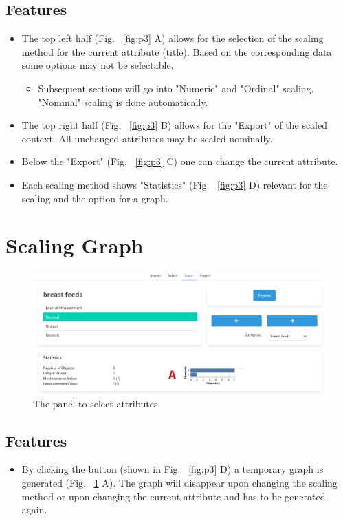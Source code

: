 \documentclass[]{article}
\begin{document}
\subsection{Features}
\begin{itemize}
    \item The top left half (Fig. ~\ref{fig:p3} A) allows for the selection of the scaling method for the current attribute (title). Based on the corresponding data some options may not be selectable.
    \begin{itemize}
        \item Subsequent sections will go into "Numeric" and "Ordinal" scaling. "Nominal" scaling is done automatically.
    \end{itemize}
    \item The top right half (Fig. ~\ref{fig:p3} B) allows for the "Export" of the scaled context. All unchanged attributes may be scaled nominally.
    \item Below the "Export" (Fig. ~\ref{fig:p3} C) one can change the current attribute.
    \item Each scaling method shows "Statistics" (Fig. ~\ref{fig:p3} D) relevant for the scaling and the option for a graph.
\end{itemize}

\section{Scaling Graph}
\begin{figure}[H]
	\includegraphics[width=\linewidth]{images/nominal_graph.png}
	\caption{The panel to select attributes}
	\label{fig:p4}
\end{figure}
\subsection{Features}
\begin{itemize}
    \item By clicking the button (shown in Fig. ~\ref{fig:p3} D)  a temporary graph is generated (Fig. ~\ref{fig:p4} A). The graph will disappear upon changing the scaling method or upon changing the current attribute and has to be generated again.
\end{itemize}
\end{document}
